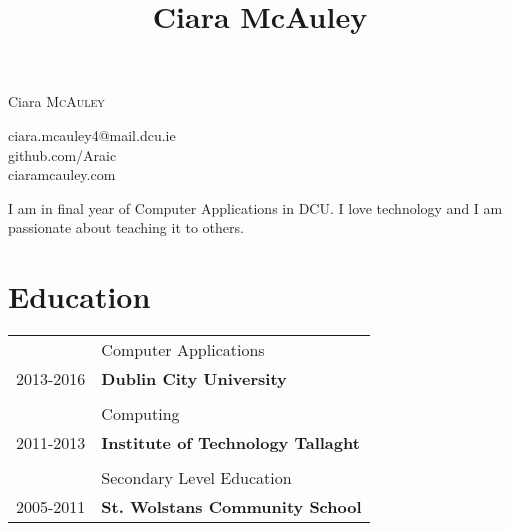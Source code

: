 \documentclass[10pt, letterpaper]{article}
\title{Ciara McAuley}
\date{\vspace{-5ex}}
\begin{document}
\par{\centering
		{\Huge Ciara \textsc{McAuley}
	}\bigskip\par}
\par{\centering
    ciara.mcauley4@mail.dcu.ie \\
    github.com/Araic \\ 
    ciaramcauley.com \\
}\bigskip\par
\par{\centering
I am in final year of Computer Applications in DCU. I love technology and I am passionate about teaching it to others.
}\bigskip\par
\section{Education}

\begin{tabular}{r|p{11cm}}
 \emph & Computer Applications \\\textsc{2013-2016}&\textbf{Dublin City University}\\\multicolumn{2}{c}{} \\
 \emph & Computing \\\textsc{2011-2013}&\textbf{Institute of Technology Tallaght}\\\multicolumn{2}{c}{} \\
\emph & Secondary Level Education \\\textsc{2005-2011}&\textbf{St. Wolstans Community School}\\
\end{tabular}
\end{document}
